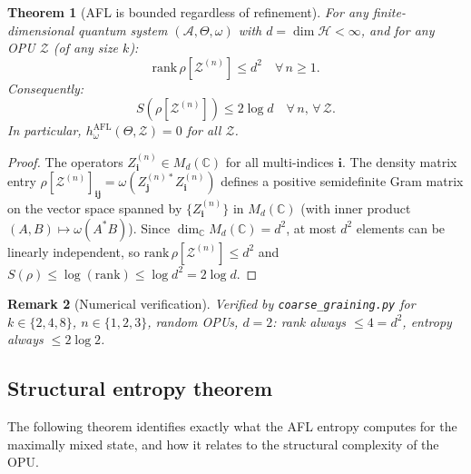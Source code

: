 \documentclass[12pt,a4paper]{article}
\newtheorem{theorem}{Theorem}[section]
\newtheorem{remark}[theorem]{Remark}
\newcommand{\HS}{\mathcal{H}}
\newcommand{\A}{\mathcal{A}}
\begin{document}
\begin{theorem}[AFL is bounded regardless of refinement]\label{thm:afl_bounded}
For any finite-dimensional quantum system $(\A,\Theta,\omega)$ with
$d=\dim\HS<\infty$, and for any OPU $\mathcal{Z}$ (of any size $k$):
\begin{equation}\label{eq:rank_always}
  \mathrm{rank}\,\rho[\mathcal{Z}^{(n)}] \leq d^2
  \quad\forall\,n\geq 1.
\end{equation}
Consequently:
\begin{equation}\label{eq:bound_always}
  S\!\left(\rho[\mathcal{Z}^{(n)}]\right) \leq 2\log d
  \quad\forall\,n,\,\forall\,\mathcal{Z}.
\end{equation}
In particular, $h_\omega^{\mathrm{AFL}}(\Theta,\mathcal{Z})=0$ for all $\mathcal{Z}$.
\end{theorem}
\begin{proof}
The operators $Z^{(n)}_\mathbf{i}\in M_d(\mathbb{C})$ for all multi-indices
$\mathbf{i}$.  The density matrix entry
$\rho[\mathcal{Z}^{(n)}]_{\mathbf{i}\mathbf{j}}=\omega(Z^{(n)*}_\mathbf{j}Z^{(n)}_\mathbf{i})$
defines a positive semidefinite Gram matrix on the vector space spanned by
$\{Z^{(n)}_\mathbf{i}\}$ in $M_d(\mathbb{C})$ (with inner product $(A,B)\mapsto\omega(A^*B)$).
Since $\dim_{\mathbb{C}}M_d(\mathbb{C})=d^2$, at most $d^2$ elements can be
linearly independent, so $\mathrm{rank}\,\rho[\mathcal{Z}^{(n)}]\leq d^2$ and
$S(\rho)\leq\log(\mathrm{rank})\leq\log d^2=2\log d$.
\end{proof}

\begin{remark}[Numerical verification]
Verified by \texttt{coarse\_graining.py} for $k\in\{2,4,8\}$, $n\in\{1,2,3\}$,
random OPUs, $d=2$: rank always $\leq 4 = d^2$, entropy always $\leq 2\log 2$.
\end{remark}

\subsection{Structural entropy theorem}

The following theorem identifies exactly what the AFL entropy computes for the
maximally mixed state, and how it relates to the structural complexity of the
OPU.
\end{document}
